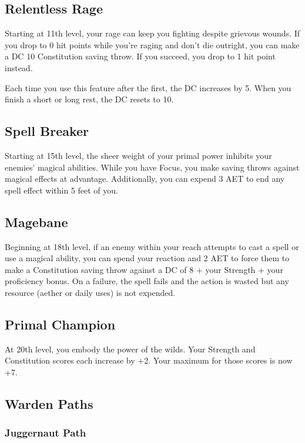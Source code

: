 \subsection{Relentless Rage}

Starting at 11th level, your rage can keep you fighting despite grievous wounds. If you drop to 0 hit points while you’re raging and don’t die outright, you can make a DC 10 Constitution saving throw. If you succeed, you drop to 1 hit point instead.

Each time you use this feature after the first, the DC increases by 5. When you finish a short or long rest, the DC resets to 10.

\subsection{Spell Breaker}
Starting at 15th level, the sheer weight of your primal power inhibits your enemies' magical abilities. While you have Focus, you make saving throws against magical effects at advantage. Additionally, you can expend 3 AET to end any spell effect within 5 feet of you.

\subsection{Magebane}

Beginning at 18th level, if an enemy within your reach attempts to cast a spell or use a magical ability, you can spend your reaction and 2 AET to force them to make a Constitution saving throw against a DC of 8 + your Strength + your proficiency bonus. On a failure, the spell fails and the action is wasted but any resource (aether or daily uses) is not expended.

\subsection{Primal Champion}

At 20th level, you embody the power of the wilds. Your Strength and Constitution scores each increase by +2. Your maximum for those scores is now +7.

\subsection{Warden Paths}

\subsubsection{Juggernaut Path}

